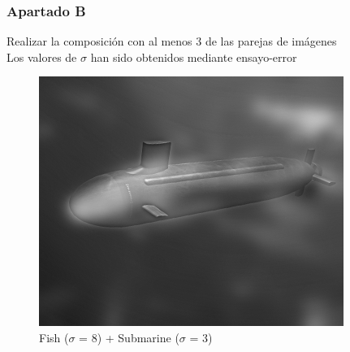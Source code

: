 \documentclass{article}
\begin{document}
\subsubsection{Apartado B} Realizar la composición con al menos 3 de las parejas de
imágenes
\\

Los valores de $\sigma$ han sido obtenidos mediante ensayo-error

\begin{minipage}{\linewidth}
    \centering
    \begin{minipage}{0.45\linewidth}
        \begin{figure}[H]
			\includegraphics[width=\linewidth]{Ejercicio3/hybrid1.png}          
			\caption{Fish ($\sigma$ = 8) + Submarine ($\sigma$ = 3)}
        \end{figure}
    \end{minipage}
    \hspace{0.05\linewidth}
    \begin{minipage}{0.45\linewidth}
        \begin{figure}[H]

\end{figure}
\end{minipage}
\end{minipage}
\end{document}

